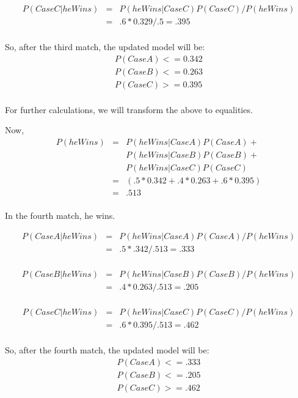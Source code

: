 \documentclass[10pt]{article}
\begin{document}
\begin{eqnarray}
P(CaseC|heWins) &=& P(heWins|CaseC)P(CaseC)/P(heWins)\\
&=& .6*0.329/.5 = .395\\
\end{eqnarray}

So, after the third match, the updated model will be: 
\begin{eqnarray}
P(CaseA) <= 0.342\\
P(CaseB) <= 0.263\\
P(CaseC) >= 0.395\\
\end{eqnarray}

For further calculations, we will transform the above to equalities.

Now,
\begin{eqnarray}
P(heWins) &=& P(heWins|CaseA)P(CaseA)+\\
&&P(heWins|CaseB)P(CaseB)+\\
&&P(heWins|CaseC)P(CaseC)\\
&=&(.5*0.342+.4*0.263+.6*0.395)\\
&=&.513\\
\end{eqnarray}

In the fourth match, he wins.

\begin{eqnarray}
P(CaseA|heWins) &=& P(heWins|CaseA)P(CaseA)/P(heWins)\\
&=& .5*.342/.513 = .333\\
\end{eqnarray}

\begin{eqnarray}
P(CaseB|heWins) &=& P(heWins|CaseB)P(CaseB)/P(heWins)\\
&=& .4*0.263/.513 = .205\\
\end{eqnarray}

\begin{eqnarray}
P(CaseC|heWins) &=& P(heWins|CaseC)P(CaseC)/P(heWins)\\
&=& .6*0.395/.513 = .462\\
\end{eqnarray}

So, after the fourth match, the updated model will be: 
\begin{eqnarray}
P(CaseA) <= .333\\
P(CaseB) <= .205\\
P(CaseC) >= .462\\
\end{eqnarray}
\end{document}
